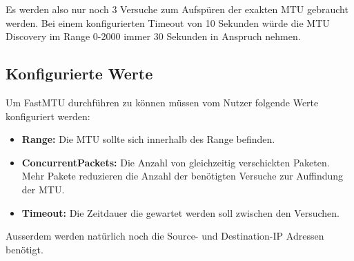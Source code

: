 Es werden also nur noch 3 Versuche zum Aufspüren der exakten \ac{MTU} gebraucht werden. Bei einem konfigurierten Timeout von 10 Sekunden würde die \ac{MTU} Discovery im Range 0-2000 immer 30 Sekunden in Anspruch nehmen.

\subsection{Konfigurierte Werte}
Um FastMTU durchführen zu können müssen vom Nutzer folgende Werte konfiguriert werden:

\begin{itemize}
  \item \textbf{Range:} Die \ac{MTU} sollte sich innerhalb des Range befinden.
  \item \textbf{ConcurrentPackets:} Die Anzahl von gleichzeitig verschickten Paketen. Mehr Pakete reduzieren die Anzahl der benötigten Versuche zur Auffindung der \ac{MTU}.
  \item \textbf{Timeout:} Die Zeitdauer die gewartet werden soll zwischen den Versuchen.
\end{itemize}

Ausserdem werden natürlich noch die Source- und Destination-IP Adressen benötigt.

